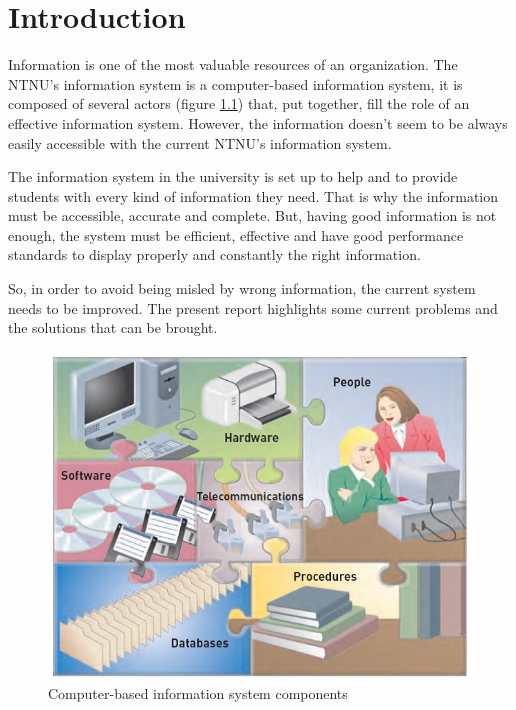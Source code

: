 \chapter{Introduction}

Information is one of the most valuable resources of an organization. The NTNU’s information system is a computer-based information system, it is composed of several actors (figure \textcolor{blue}{\ref{fig:infsyscom}})  that, put together, fill the role of an effective information system. However, the information doesn’t seem to be always easily accessible with the current NTNU’s information system.

The information system in the university is set up to help and to provide students with every kind of information they need. That is why the information must be accessible, accurate and complete. But, having good information is not enough, the system must be efficient, effective and have good performance standards to display properly and constantly the right information.

So, in order to avoid being misled by wrong information, the current system needs to be improved. The present report highlights some current problems and the solutions that can be brought.

\begin{figure}[h]
	\begin{center}
		\centerline{\includegraphics[scale=0.57]{infsyscom}}
		\caption[Computer-based information system components]{Computer-based information system components}
		\label{fig:infsyscom}
	\end{center}
\end{figure}
